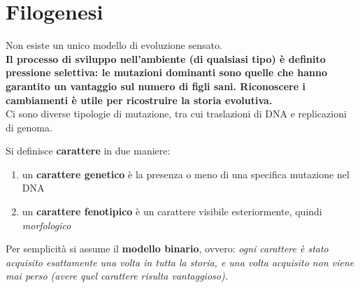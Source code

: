 \documentclass[a4paper,12pt, oneside]{book}
\begin{document}
\chapter{Filogenesi}
Non esiste un unico modello di evoluzione sensato. \\
\textbf{Il processo di sviluppo nell’ambiente (di qualsiasi tipo) è
  definito pressione selettiva: le mutazioni 
dominanti sono quelle che hanno garantito un vantaggio sul numero di
figli sani. Riconoscere i 
cambiamenti è utile per ricostruire la storia evolutiva.}\\
Ci sono diverse tipologie di mutazione, tra cui traslazioni di DNA e
replicazioni di genoma.
\begin{definizione}
  Si definisce \textbf{carattere} in due maniere:
  \begin{enumerate}
    \item un \textbf{carattere genetico} è la presenza o meno di
    una specifica mutazione nel DNA
    \item un \textbf{carattere fenotipico} è un carattere visibile
    esteriormente, quindi \textit{morfologico}
  \end{enumerate}
\end{definizione}
Per semplicità si assume il \textbf{modello binario}, ovvero:
\textit{ogni carattere è stato acquisito esattamente una volta in tutta la
storia, e una volta acquisito non viene mai perso (avere quel
carattere risulta vantaggioso).}
\end{document}
